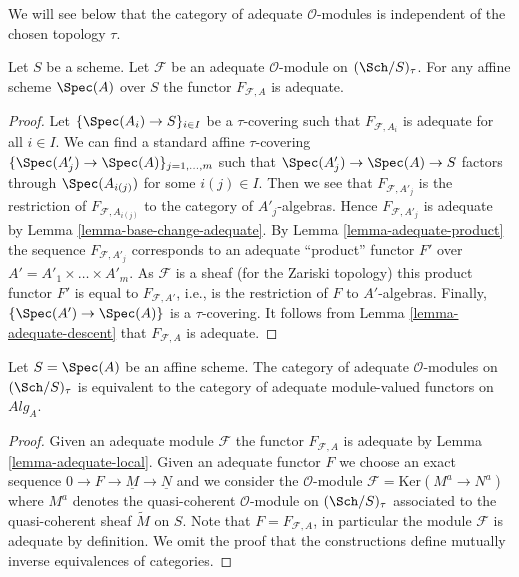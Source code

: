 \noindent
We will see below that the category of adequate $\mathcal{O}$-modules
is independent of the chosen topology $\tau$.

\begin{lemma}
\label{lemma-adequate-local}
Let $S$ be a scheme. Let $\mathcal{F}$ be an adequate $\mathcal{O}$-module on
$(\Sch/S)_\tau$. For any affine scheme $\Spec(A)$ over $S$
the functor $F_{\mathcal{F}, A}$ is adequate.
\end{lemma}

\begin{proof}
Let $\{\Spec(A_i) \to S\}_{i \in I}$ be a $\tau$-covering
such that $F_{\mathcal{F}, A_i}$ is adequate for all $i \in I$.
We can find a standard affine $\tau$-covering
$\{\Spec(A'_j) \to \Spec(A)\}_{j = 1, \ldots, m}$
such that $\Spec(A'_j) \to \Spec(A) \to S$ factors
through $\Spec(A_{i(j)})$ for some $i(j) \in I$. Then we see that
$F_{\mathcal{F}, A'_j}$ is the restriction of
$F_{\mathcal{F}, A_{i(j)}}$ to the category of $A'_j$-algebras.
Hence $F_{\mathcal{F}, A'_j}$ is adequate by
Lemma \ref{lemma-base-change-adequate}.
By
Lemma \ref{lemma-adequate-product}
the sequence
$F_{\mathcal{F}, A'_j}$ corresponds to an adequate ``product'' functor
$F'$ over $A' = A'_1 \times \ldots \times A'_m$. As $\mathcal{F}$ is a
sheaf (for the Zariski topology) this product functor $F'$ is equal
to $F_{\mathcal{F}, A'}$, i.e., is the restriction of $F$ to $A'$-algebras.
Finally,  $\{\Spec(A') \to \Spec(A)\}$ is a $\tau$-covering.
It follows from
Lemma \ref{lemma-adequate-descent}
that $F_{\mathcal{F}, A}$ is adequate.
\end{proof}

\begin{lemma}
\label{lemma-adequate-affine}
Let $S = \Spec(A)$ be an affine scheme. The category of adequate
$\mathcal{O}$-modules on $(\Sch/S)_\tau$ is equivalent to the
category of adequate module-valued functors on $\textit{Alg}_A$.
\end{lemma}

\begin{proof}
Given an adequate module $\mathcal{F}$ the functor $F_{\mathcal{F}, A}$
is adequate by Lemma \ref{lemma-adequate-local}.
Given an adequate functor $F$ we choose an exact sequence
$0 \to F \to \underline{M} \to \underline{N}$ and we consider
the $\mathcal{O}$-module $\mathcal{F} = \text{Ker}(M^a \to N^a)$ where
$M^a$ denotes the quasi-coherent $\mathcal{O}$-module on
$(\Sch/S)_\tau$ associated to the quasi-coherent sheaf
$\widetilde{M}$ on $S$. Note that $F = F_{\mathcal{F}, A}$, in particular
the module $\mathcal{F}$ is adequate by definition.
We omit the proof that the constructions define mutually inverse
equivalences of categories.
\end{proof}

